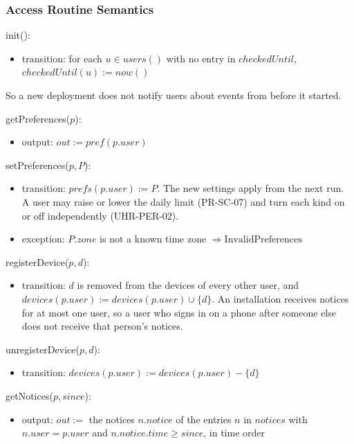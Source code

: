 \documentclass[12pt, titlepage]{article}
\begin{document}
\subsubsection{Access Routine Semantics}

\noindent init():
\begin{itemize}
\item transition: for each $u \in \mathit{users}()$ with no entry in
  $\mathit{checkedUntil}$, $\mathit{checkedUntil}(u) := \mathit{now}()$
\end{itemize}

\noindent So a new deployment does not notify users about events from before
it started.

\medskip

\noindent getPreferences($p$):
\begin{itemize}
\item output: $\mathit{out} := \mathit{pref}(p.\mathit{user})$
\end{itemize}

\noindent setPreferences($p, P$):
\begin{itemize}
\item transition: $\mathit{prefs}(p.\mathit{user}) := P$. The new settings
  apply from the next run. A user may raise or lower the daily limit
  (PR-SC-07) and turn each kind on or off independently (UHR-PER-02).
\item exception: $P.\mathit{zone}$ is not a known time zone $\Rightarrow
  \mathrm{InvalidPreferences}$
\end{itemize}

\noindent registerDevice($p, d$):
\begin{itemize}
\item transition: $d$ is removed from the devices of every other user, and
  $\mathit{devices}(p.\mathit{user}) := \mathit{devices}(p.\mathit{user})
  \cup \{d\}$. An installation receives notices for at most one user, so a
  user who signs in on a phone after someone else does not receive that
  person's notices.
\end{itemize}

\noindent unregisterDevice($p, d$):
\begin{itemize}
\item transition: $\mathit{devices}(p.\mathit{user}) :=
  \mathit{devices}(p.\mathit{user}) - \{d\}$
\end{itemize}

\noindent getNotices($p, \mathit{since}$):
\begin{itemize}
\item output: $\mathit{out} :=$ the notices $n.\mathit{notice}$ of the
  entries $n$ in $\mathit{notices}$ with $n.\mathit{user} = p.\mathit{user}$
  and $n.\mathit{notice}.\mathit{time} \geq \mathit{since}$, in time order
\end{itemize}
\end{document}
